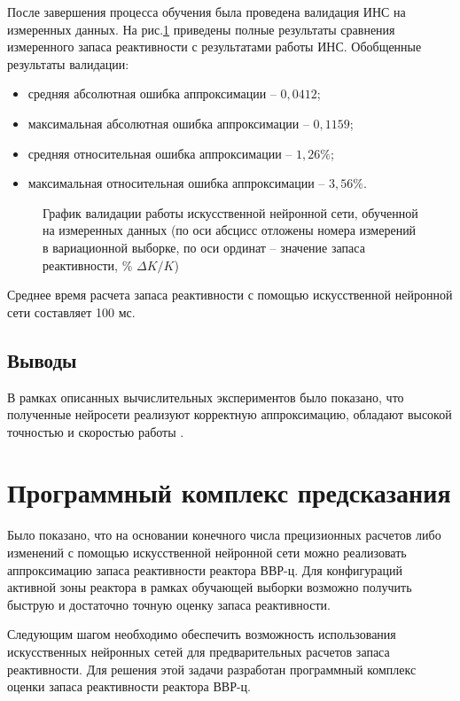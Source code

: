 После завершения процесса обучения была проведена валидация ИНС на измеренных данных.
На рис.\ref{pic:real-rus} приведены полные результаты сравнения
измеренного запаса реактивности с результатами работы ИНС.
Обобщенные результаты валидации:

\begin{itemize}
\item
  средняя абсолютная ошибка аппроксимации -- $0,0412$;
\item
  максимальная абсолютная ошибка аппроксимации -- $0,1159$;
\item
  средняя относительная ошибка аппроксимации -- $1,26\%$;
\item
  максимальная относительная ошибка аппроксимации -- $3,56\%$.
\end{itemize}

\begin{figure}[p]
    \caption[График валидации ИНС на измеренных данных]{График валидации работы искусственной нейронной сети, обученной
    на измеренных данных (по оси абсцисс отложены номера измерений в
    вариационной выборке, по оси ординат -- значение запаса реактивности,
    \% $\Delta K/K$)}
    \label{pic:real-rus}
\end{figure}

Среднее время расчета запаса реактивности с помощью искусственной
нейронной сети составляет 100 мс.

\subsection{Выводы}

В рамках описанных вычислительных экспериментов было показано, что
полученные нейросети реализуют корректную аппроксимацию, обладают
высокой точностью и скоростью работы \cite{iop-2018}.

\section{Программный комплекс предсказания}

Было показано, что на основании конечного числа прецизионных расчетов либо изменений с помощью искусственной нейронной сети можно реализовать аппроксимацию запаса реактивности реактора ВВР-ц.
Для конфигураций активной зоны реактора в рамках обучающей выборки возможно получить быструю и достаточно точную оценку запаса реактивности.

Следующим шагом необходимо обеспечить возможность использования искусственных нейронных сетей для предварительных расчетов запаса реактивности.
Для решения этой задачи разработан программный комплекс оценки запаса реактивности реактора ВВР-ц.

